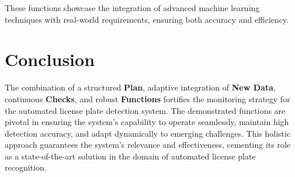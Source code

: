 These functions showcase the integration of advanced machine learning techniques with real-world requirements, ensuring both accuracy and efficiency.

\section{Conclusion}

The combination of a structured \textbf{Plan}, adaptive integration of \textbf{New Data}, continuous \textbf{Checks}, and robust \textbf{Functions} fortifies the monitoring strategy for the automated license plate detection system. The demonstrated functions are pivotal in ensuring the system's capability to operate seamlessly, maintain high detection accuracy, and adapt dynamically to emerging challenges. This holistic approach guarantees the system’s relevance and effectiveness, cementing its role as a state-of-the-art solution in the domain of automated license plate recognition.
